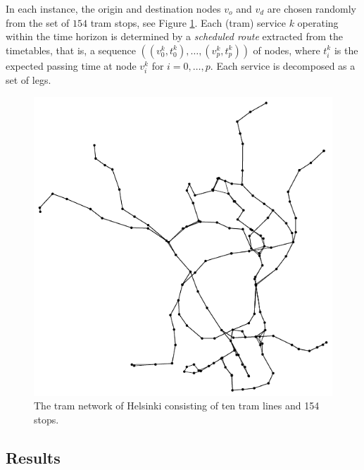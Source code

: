 \documentclass[dissertation,draft*]{aaltoseries}
\begin{document}
In each instance, the origin and destination nodes $v_o$ and $v_d$ are chosen randomly from the 
set of $154$ tram stops, see Figure \ref{verkot01}. 
Each (tram) service $k$ operating within the time horizon is determined by a \emph{scheduled route} extracted from the timetables, that is, 
a sequence $((v_0^k,t_0^k),\ldots,(v_p^k,t_p^k))$ of 
nodes, where $t_i^k$ is the expected passing time at node $v_i^k$ 
for $i=0,\ldots,p$. Each service is
decomposed as a set of legs.

\begin{figure}[ht]
\begin{center}
\includegraphics[width=0.5\columnwidth]{verkot01a}
\end{center}
\caption{The tram network of Helsinki consisting of ten tram lines and 154 stops. 
}
\label{verkot01}
\end{figure}


\subsection{Results}
\end{document}
